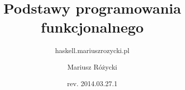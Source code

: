 \documentclass[t]{beamer}
\title{Podstawy programowania funkcjonalnego}
\subtitle{haskell.mariuszrozycki.pl}
\author{Mariusz Różycki}
\institute{Churchill College, University of Cambridge}
\date{rev. 2014.03.27.1}
\begin{document}
\frame{\maketitle}






\end{document}
